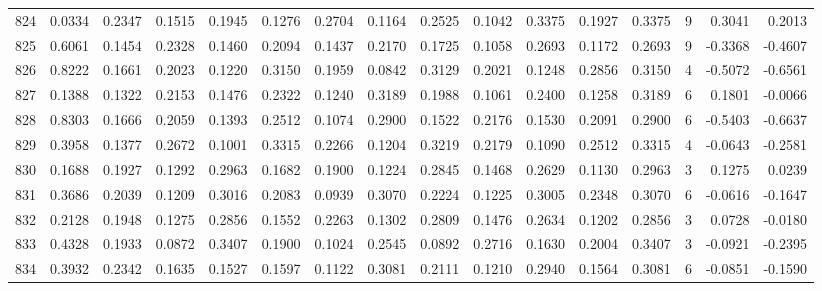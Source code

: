 \begin{tabular}{lrrrrrrrrrrrrrrr}
824 &      0.0334 &  0.2347 &  0.1515 &  0.1945 &  0.1276 &  0.2704 &  0.1164 &  0.2525 &  0.1042 &  0.3375 &   0.1927 &     0.3375 &      9 &                    0.3041 &                     0.2013 \\
825 &      0.6061 &  0.1454 &  0.2328 &  0.1460 &  0.2094 &  0.1437 &  0.2170 &  0.1725 &  0.1058 &  0.2693 &   0.1172 &     0.2693 &      9 &                   -0.3368 &                    -0.4607 \\
826 &      0.8222 &  0.1661 &  0.2023 &  0.1220 &  0.3150 &  0.1959 &  0.0842 &  0.3129 &  0.2021 &  0.1248 &   0.2856 &     0.3150 &      4 &                   -0.5072 &                    -0.6561 \\
827 &      0.1388 &  0.1322 &  0.2153 &  0.1476 &  0.2322 &  0.1240 &  0.3189 &  0.1988 &  0.1061 &  0.2400 &   0.1258 &     0.3189 &      6 &                    0.1801 &                    -0.0066 \\
828 &      0.8303 &  0.1666 &  0.2059 &  0.1393 &  0.2512 &  0.1074 &  0.2900 &  0.1522 &  0.2176 &  0.1530 &   0.2091 &     0.2900 &      6 &                   -0.5403 &                    -0.6637 \\
829 &      0.3958 &  0.1377 &  0.2672 &  0.1001 &  0.3315 &  0.2266 &  0.1204 &  0.3219 &  0.2179 &  0.1090 &   0.2512 &     0.3315 &      4 &                   -0.0643 &                    -0.2581 \\
830 &      0.1688 &  0.1927 &  0.1292 &  0.2963 &  0.1682 &  0.1900 &  0.1224 &  0.2845 &  0.1468 &  0.2629 &   0.1130 &     0.2963 &      3 &                    0.1275 &                     0.0239 \\
831 &      0.3686 &  0.2039 &  0.1209 &  0.3016 &  0.2083 &  0.0939 &  0.3070 &  0.2224 &  0.1225 &  0.3005 &   0.2348 &     0.3070 &      6 &                   -0.0616 &                    -0.1647 \\
832 &      0.2128 &  0.1948 &  0.1275 &  0.2856 &  0.1552 &  0.2263 &  0.1302 &  0.2809 &  0.1476 &  0.2634 &   0.1202 &     0.2856 &      3 &                    0.0728 &                    -0.0180 \\
833 &      0.4328 &  0.1933 &  0.0872 &  0.3407 &  0.1900 &  0.1024 &  0.2545 &  0.0892 &  0.2716 &  0.1630 &   0.2004 &     0.3407 &      3 &                   -0.0921 &                    -0.2395 \\
834 &      0.3932 &  0.2342 &  0.1635 &  0.1527 &  0.1597 &  0.1122 &  0.3081 &  0.2111 &  0.1210 &  0.2940 &   0.1564 &     0.3081 &      6 &                   -0.0851 &                    -0.1590 \\

\end{tabular}
